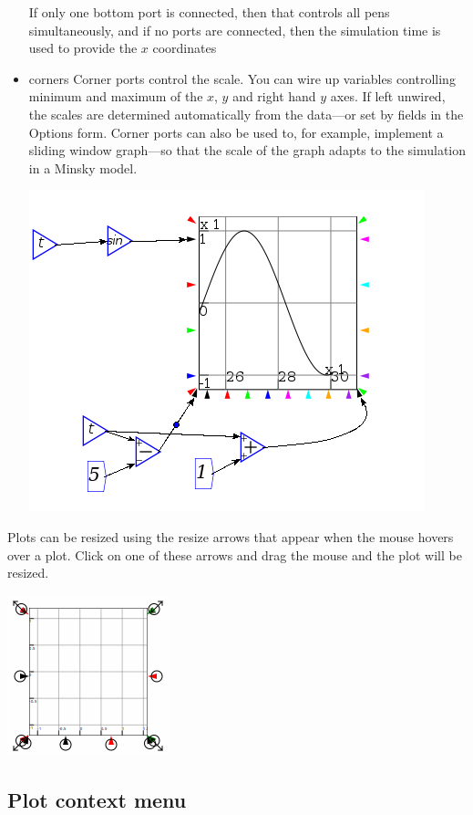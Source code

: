 \begin{itemize}
If only one bottom port is connected, then that controls all pens
simultaneously, and if no ports are connected, then the simulation
time is used to provide the $x$ coordinates 
\item corners Corner ports control the scale. You can wire up variables
controlling minimum and maximum of the $x$, $y$ and right hand $y$
axes. If left unwired, the scales are determined automatically from
the data---or set by fields in the Options form. Corner ports can
also be used to, for example, implement a sliding window graph---so
that the scale of the graph adapts to the simulation in a Minsky model.
\begin{center}
\includegraphics{images/plotSlidingWindow} 
\par\end{center}

\end{itemize}
Plots can be resized using the resize arrows that appear when the
mouse hovers over a plot. Click on one of these arrows and drag the
mouse and the plot will be resized.

\includegraphics{images/plotResize}

\subsection{Plot context menu}

